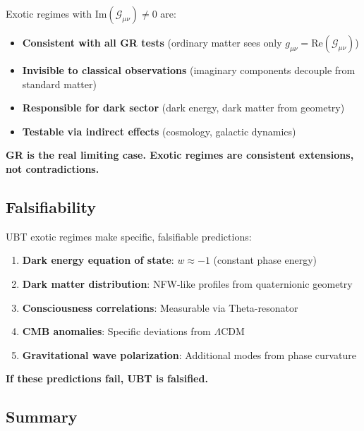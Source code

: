 \begin{tcolorbox}[colback=blue!5!white,colframe=blue!75!black,title=GR Compatibility]
Exotic regimes with $\text{Im}(\mathcal{G}_{\mu\nu}) \neq 0$ are:

\begin{itemize}
    \item \textbf{Consistent with all GR tests} (ordinary matter sees only $g_{\mu\nu} = \text{Re}(\mathcal{G}_{\mu\nu})$)
    \item \textbf{Invisible to classical observations} (imaginary components decouple from standard matter)
    \item \textbf{Responsible for dark sector} (dark energy, dark matter from geometry)
    \item \textbf{Testable via indirect effects} (cosmology, galactic dynamics)
\end{itemize}

\textbf{GR is the real limiting case. Exotic regimes are consistent extensions, not contradictions.}
\end{tcolorbox}

\subsection{Falsifiability}

UBT exotic regimes make specific, falsifiable predictions:

\begin{enumerate}
    \item \textbf{Dark energy equation of state}: $w \approx -1$ (constant phase energy)
    \item \textbf{Dark matter distribution}: NFW-like profiles from quaternionic geometry
    \item \textbf{Consciousness correlations}: Measurable via Theta-resonator
    \item \textbf{CMB anomalies}: Specific deviations from $\Lambda$CDM
    \item \textbf{Gravitational wave polarization}: Additional modes from phase curvature
\end{enumerate}

\textbf{If these predictions fail, UBT is falsified.}

\subsection{Summary}

